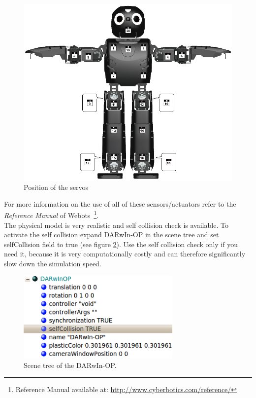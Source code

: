 \documentclass[a4paper, 12pt]{article}  		%
\begin{document}
\newpage
\vspace{5cm}
\begin{figure}[H]
\begin{center}
\includegraphics[width=16cm]{DARwIn-OP_Actuator.png}
\caption{Position of the servos}
\label{Actuator}
\end{center}
\end{figure}
For more information on the use of all of these sensors/actuators refer to the \textit{Reference Manual} of Webots \,\footnote{ Reference Manual available at: \url{http://www.cyberbotics.com/reference/}}.\\



\newpage
The physical model is very realistic and self collision check is available. To activate the self collision expand DARwIn-OP in the scene tree and set selfCollision field to true (see figure \ref{selfCollision}). Use the self collision check only if you need it, because it is very computationally costly and can therefore significantly slow down the simulation speed.\\

\begin{figure}[H]
\begin{center}
\includegraphics[width=8cm]{selfCollision.png}
\caption{Scene tree of the DARwIn-OP.}
\label{selfCollision}
\end{center}
\end{figure}
\end{document}
